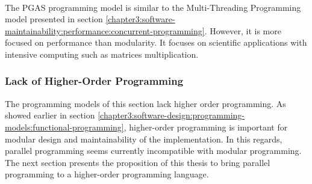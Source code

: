 
\paragraph{}


The PGAS programming model is similar to the Multi-Threading Programming model presented in section \ref{chapter3:software-maintainability:performance:concurrent-programming}. 
However, it is more focused on performance than modularity.
It focuses on scientific applications with intensive computing such as matrices multiplication.


\subsubsection{Lack of Higher-Order Programming}

The programming models of this section lack higher order programming.
As showed earlier in section \ref{chapter3:software-design:programming-models:functional-programming}, higher-order programming is important for modular design and maintainability of the implementation.
In this regards, parallel programming seems currently incompatible with modular programming.
The next section presents the proposition of this thesis to bring parallel programming to a higher-order programming language.


